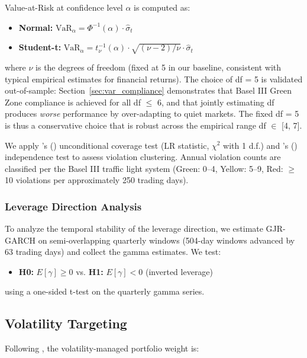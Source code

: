 Value-at-Risk at confidence level $\alpha$ is computed as:
\begin{itemize}
\item \textbf{Normal:} $\text{VaR}_\alpha = \Phi^{-1}(\alpha) \cdot \hat{\sigma}_t$
\item \textbf{Student-t:} $\text{VaR}_\alpha = t^{-1}_\nu(\alpha) \cdot \sqrt{(\nu-2)/\nu} \cdot \hat{\sigma}_t$

\end{itemize}
where $\nu$ is the degrees of freedom (fixed at 5 in our baseline, consistent with typical empirical estimates for financial returns). The choice of df = 5 is validated out-of-sample: Section~\ref{sec:var_compliance} demonstrates that Basel III Green Zone compliance is achieved for all df $\leq$ 6, and that jointly estimating df produces \textit{worse} performance by over-adapting to quiet markets. The fixed df = 5 is thus a conservative choice that is robust across the empirical range df $\in$ [4, 7].

We apply \citeauthor{kupiec1995}'s (\citeyear{kupiec1995}) unconditional coverage test (LR statistic, $\chi^{2}$ with 1 d.f.) and \citeauthor{christoffersen1998}'s (\citeyear{christoffersen1998}) independence test to assess violation clustering. Annual violation counts are classified per the Basel III traffic light system (Green: 0--4, Yellow: 5--9, Red: $\geq$10 violations per approximately 250 trading days).

\subsubsection{Leverage Direction Analysis}

To analyze the temporal stability of the leverage direction, we estimate GJR-GARCH on semi-overlapping quarterly windows (504-day windows advanced by 63 trading days) and collect the gamma estimates. We test:
\begin{itemize}
\item \textbf{H0:} $E[\gamma] \geq 0$ vs. \textbf{H1:} $E[\gamma] < 0$ (inverted leverage)
\end{itemize}
using a one-sided t-test on the quarterly gamma series.

\subsection{Volatility Targeting}
\label{sec:vt_methodology}

Following \citet{moreira2017}, the volatility-managed portfolio weight is:

